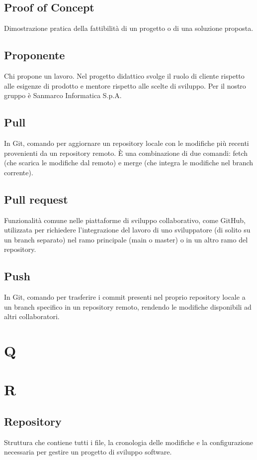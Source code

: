    \subsection{Proof of Concept}
    Dimostrazione pratica della fattibilità di un progetto o di una soluzione proposta.
    \subsection{Proponente}
    Chi propone un lavoro. Nel progetto didattico svolge il ruolo di cliente 
    rispetto alle esigenze di prodotto e mentore rispetto alle scelte di sviluppo.
    Per il nostro gruppo è Sanmarco Informatica S.p.A.
    \subsection{Pull}
    In Git, comando per aggiornare un repository locale con le modifiche più recenti provenienti 
    da un repository remoto. È una combinazione di due comandi: fetch (che scarica le modifiche 
    dal remoto) e merge (che integra le modifiche nel branch corrente).
    \subsection{Pull request}
    Funzionalità comune nelle piattaforme di sviluppo collaborativo, come GitHub, utilizzata per 
    richiedere l'integrazione del lavoro di uno sviluppatore (di solito su un branch separato) 
    nel ramo principale (main o master) o in un altro ramo del repository.
    \subsection{Push}
    In Git, comando per trasferire i commit presenti nel proprio repository locale a un 
    branch specifico in un repository remoto, rendendo le modifiche disponibili 
    ad altri collaboratori.

\section{Q}
\section{R}
    \subsection{Repository}
    Struttura che contiene tutti i file, la cronologia delle modifiche e la 
    configurazione necessaria per gestire un progetto di sviluppo software.
